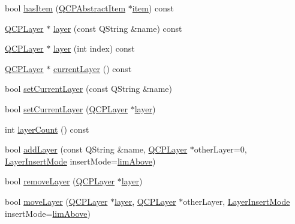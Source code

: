 \begin{DoxyCompactItemize}
\item 
bool \mbox{\hyperlink{class_q_custom_plot_af0b57f35646079f93fa6161a65b36109}{has\+Item}} (\mbox{\hyperlink{class_q_c_p_abstract_item}{Q\+C\+P\+Abstract\+Item}} $\ast$\mbox{\hyperlink{class_q_custom_plot_ac042f2e78edd228ccf2f26b7fe215239}{item}}) const
\item 
\mbox{\hyperlink{class_q_c_p_layer}{Q\+C\+P\+Layer}} $\ast$ \mbox{\hyperlink{class_q_custom_plot_a0a96244e7773b242ef23c32b7bdfb159}{layer}} (const Q\+String \&name) const
\item 
\mbox{\hyperlink{class_q_c_p_layer}{Q\+C\+P\+Layer}} $\ast$ \mbox{\hyperlink{class_q_custom_plot_acbb570f4c24306e7c2324d40bfe157c2}{layer}} (int index) const
\item 
\mbox{\hyperlink{class_q_c_p_layer}{Q\+C\+P\+Layer}} $\ast$ \mbox{\hyperlink{class_q_custom_plot_a0421d647f420b0b4c57aec1708857af5}{current\+Layer}} () const
\item 
bool \mbox{\hyperlink{class_q_custom_plot_a73a6dc47c653bb6f8f030abca5a11852}{set\+Current\+Layer}} (const Q\+String \&name)
\item 
bool \mbox{\hyperlink{class_q_custom_plot_a23a4d3cadad1a0063c5fe19aac5659e6}{set\+Current\+Layer}} (\mbox{\hyperlink{class_q_c_p_layer}{Q\+C\+P\+Layer}} $\ast$\mbox{\hyperlink{class_q_custom_plot_a0a96244e7773b242ef23c32b7bdfb159}{layer}})
\item 
int \mbox{\hyperlink{class_q_custom_plot_afa45d61e65292026f4c58c9c88c2cef0}{layer\+Count}} () const
\item 
bool \mbox{\hyperlink{class_q_custom_plot_ad5255393df078448bb6ac83fa5db5f52}{add\+Layer}} (const Q\+String \&name, \mbox{\hyperlink{class_q_c_p_layer}{Q\+C\+P\+Layer}} $\ast$other\+Layer=0, \mbox{\hyperlink{class_q_custom_plot_a75a8afbe6ef333b1f3d47abb25b9add7}{Layer\+Insert\+Mode}} insert\+Mode=\mbox{\hyperlink{class_q_custom_plot_a75a8afbe6ef333b1f3d47abb25b9add7a062b0b7825650b432a713c0df6742d41}{lim\+Above}})
\item 
bool \mbox{\hyperlink{class_q_custom_plot_a40f75e342c5eaab6a86066a42a0e2a94}{remove\+Layer}} (\mbox{\hyperlink{class_q_c_p_layer}{Q\+C\+P\+Layer}} $\ast$\mbox{\hyperlink{class_q_custom_plot_a0a96244e7773b242ef23c32b7bdfb159}{layer}})
\item 
bool \mbox{\hyperlink{class_q_custom_plot_ae896140beff19424e9e9e02d6e331104}{move\+Layer}} (\mbox{\hyperlink{class_q_c_p_layer}{Q\+C\+P\+Layer}} $\ast$\mbox{\hyperlink{class_q_custom_plot_a0a96244e7773b242ef23c32b7bdfb159}{layer}}, \mbox{\hyperlink{class_q_c_p_layer}{Q\+C\+P\+Layer}} $\ast$other\+Layer, \mbox{\hyperlink{class_q_custom_plot_a75a8afbe6ef333b1f3d47abb25b9add7}{Layer\+Insert\+Mode}} insert\+Mode=\mbox{\hyperlink{class_q_custom_plot_a75a8afbe6ef333b1f3d47abb25b9add7a062b0b7825650b432a713c0df6742d41}{lim\+Above}})

\end{DoxyCompactItemize}
